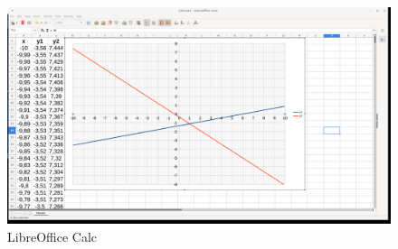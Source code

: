 \begin{figure}[h!]		
	\centering
   	\includegraphics[width=8.0in]{pictures/picture_028.png}
  	\caption{LibreOffice Calc}
   	\label{fig:LibreOfficeCalc028}
\end{figure}